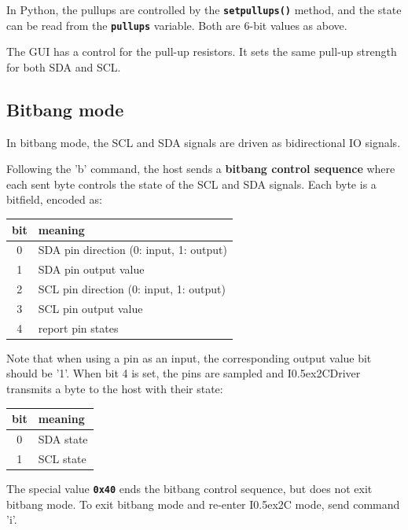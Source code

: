 \documentclass{article}
\newcommand{\two}{\raise0.5ex\hbox{\footnotesize{2}}}
\newcommand{\iic}{I\two{}C}
\newcommand{\iicdriver}{I\two{}CDriver}
\newcommand{\mach}[1]{\texttt{\textbf{#1}}}
\newcommand{\gap}{\vspace{10pt}}
\begin{document}
In Python, the pullups are controlled by the \mach{setpullups()} method, and the state can be read from the \mach{pullups} variable.
Both are 6-bit values as above.

The GUI has a control for the pull-up resistors.
It sets the same pull-up strength for both SDA and SCL.

\subsection{Bitbang mode}\label{bitbang}

In bitbang mode, the SCL and SDA signals are driven as bidirectional IO signals.

Following the 'b' command,
the host sends a \textbf{bitbang control sequence} 
where each sent byte controls the state of the SCL and SDA signals.
Each byte is a bitfield, encoded as:

\begin{center}\begin{tabular}{cl}
\hline
bit & meaning \\
\hline
  0         & SDA pin direction (0: input, 1: output) \\
  1         & SDA pin output value \\
  2         & SCL pin direction (0: input, 1: output) \\
  3         & SCL pin output value \\
  4         & report pin states \\
\hline
\end{tabular}\end{center}\gap

Note that when using a pin as an input, the corresponding output value bit should be '1'.
When bit 4 is set, the pins are sampled and \iicdriver{} transmits a byte to the host with their state:

\begin{center}\begin{tabular}{cl}
\hline
bit & meaning \\
\hline
  0         & SDA state \\
  1         & SCL state \\
\hline
\end{tabular}\end{center}\gap

The special value \mach{0x40} ends the bitbang control sequence,
but does not exit bitbang mode.
To exit bitbang mode and re-enter \iic{} mode,
send command 'i'.
\end{document}
